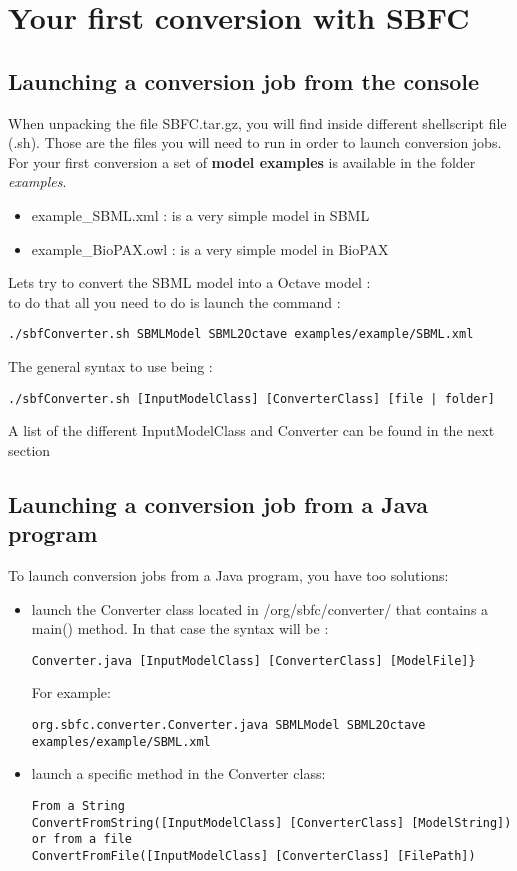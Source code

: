 \documentclass{article}
\begin{document}
\section{Your first conversion with SBFC}
	\subsection{Launching a conversion job from the console}
When unpacking the file SBFC.tar.gz, you will find inside different shellscript file (.sh). Those are the files you will need to run in order to launch conversion jobs. \\
For your first conversion a set of {\bf model examples} is available in the folder {\it examples}.\\
\begin{itemize}
\item example\_SBML.xml : is a very simple model in SBML
\item example\_BioPAX.owl : is a very simple model in BioPAX
\end{itemize}
Lets try to convert the SBML model into a Octave model :\\
to do that all you need to do is launch the command :  
\begin{lstlisting}
./sbfConverter.sh SBMLModel SBML2Octave examples/example/SBML.xml
\end{lstlisting}
The general syntax to use being :
\begin{lstlisting}
./sbfConverter.sh [InputModelClass] [ConverterClass] [file | folder]
\end{lstlisting}
A list of the different InputModelClass and Converter can be found in the next section
	\subsection{Launching a conversion job from a Java program}
To launch conversion jobs from a Java program, you have too solutions:
\begin{itemize}
\item launch the Converter class located in /org/sbfc/converter/ that contains a main() method. In that case the syntax will be :
\begin{lstlisting}
Converter.java [InputModelClass] [ConverterClass] [ModelFile]}
\end{lstlisting}For example: 
\begin{lstlisting}
org.sbfc.converter.Converter.java SBMLModel SBML2Octave examples/example/SBML.xml
\end{lstlisting}
\item launch a specific method in the Converter class: 
\begin{lstlisting}
From a String
ConvertFromString([InputModelClass] [ConverterClass] [ModelString])
or from a file
ConvertFromFile([InputModelClass] [ConverterClass] [FilePath])
\end{lstlisting}
\end{itemize}
\end{document}
